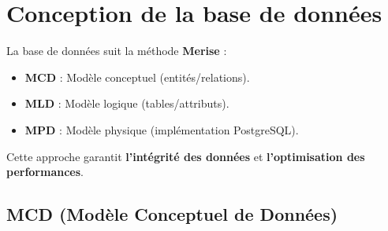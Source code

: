 \newpage

\section{Conception de la base de données}
La base de données suit la méthode \textbf{Merise} :
\begin{itemize}
    \item \textbf{MCD} : Modèle conceptuel (entités/relations).
    \item \textbf{MLD} : Modèle logique (tables/attributs).
    \item \textbf{MPD} : Modèle physique (implémentation PostgreSQL).
\end{itemize}
Cette approche garantit \textbf{l’intégrité des données} et \textbf{l’optimisation des performances}.

\subsection{MCD (Modèle Conceptuel de Données)}

